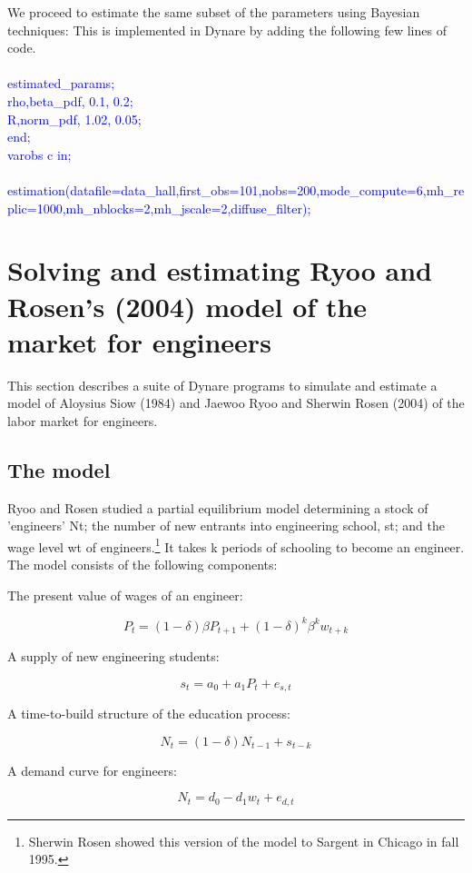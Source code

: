 \documentclass[a4paper,12pt]{scrartcl} %
\begin{document}
We proceed to estimate the same subset of the parameters using Bayesian techniques: This is implemented in Dynare by adding the following few lines of code.\\
\\
\textcolor{blue}{
estimated\_params;\\
rho,beta\_pdf, 0.1, 0.2;\\
R,norm\_pdf, 1.02, 0.05;\\
end;\\
varobs c in;\\
\\
estimation(datafile=data\_hall,first\_obs=101,nobs=200,mode\_compute=6,mh\_replic=1000,mh\_nblocks=2,mh\_jscale=2,diffuse\_filter);}\\



\section{Solving and estimating Ryoo and Rosen’s (2004) model of the market for engineers}

This section describes a suite of Dynare programs to simulate and estimate a model of Aloysius Siow (1984) and Jaewoo Ryoo and Sherwin Rosen (2004) of the labor market for engineers.

\subsection{The model}

Ryoo and Rosen studied a partial equilibrium model determining a stock of ’engineers’ Nt; the number of new entrants into engineering school, st; and the wage level wt of engineers.\footnote{Sherwin Rosen showed this version of the model to Sargent in Chicago in fall 1995.} It takes k periods of schooling to become an engineer. The model consists of the following components:

The present value of wages of an engineer:

$$P_t=(1-\delta)\beta P_{t+1}+(1-\delta)^k\beta^kw_{t+k}$$

A supply of new engineering students:

$$s_t=a_0+a_1P_t+e_{s,t}$$

A time-to-build structure of the education process:

$$N_t=(1-\delta)N_{t-1}+s_{t-k}$$

A demand curve for engineers:

$$N_t=d_0-d_1w_t+e_{d,t}$$
\end{document}

